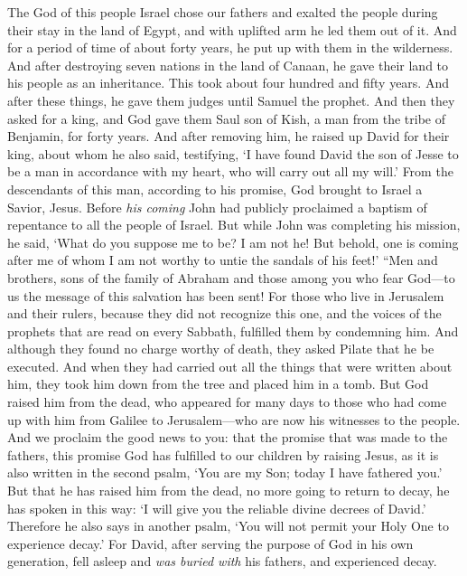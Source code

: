 \begin{biblechapter}
\verse The God of this people Israel chose our fathers and exalted the people during their stay in the land of Egypt, and with uplifted arm he led them out of it.
\verse And for a period of time of about forty years, he put up with them in the wilderness.
\verse And after destroying seven nations in the land of Canaan, he gave their land to his people as an inheritance.
\verse This took about four hundred and fifty years. And after these things, he gave them judges until Samuel the prophet.
\verse And then they asked for a king, and God gave them Saul son of Kish, a man from the tribe of Benjamin, for forty years.
\verse And after removing him, he raised up David for their king, about whom he also said, testifying, ‘I have found David the son of Jesse to be a man in accordance with my heart, who will carry out all my will.’
\verse From the descendants of this man, according to his promise, God brought to Israel a Savior, Jesus.
\verse Before \textit{his coming} John had publicly proclaimed a baptism of repentance to all the people of Israel.
\verse But while John was completing his mission, he said, ‘What do you suppose me to be? I am not he! But behold, one is coming after me of whom I am not worthy to untie the sandals of his feet!’
\verse “Men and brothers, sons of the family of Abraham and those among you who fear God—to us the message of this salvation has been sent!
\verse For those who live in Jerusalem and their rulers, because they did not recognize this one, and the voices of the prophets that are read on every Sabbath, fulfilled them by condemning him.
\verse And although they found no charge worthy of death, they asked Pilate that he be executed.
\verse And when they had carried out all the things that were written about him, they took him down from the tree and placed him in a tomb.
\verse But God raised him from the dead,
\verse who appeared for many days to those who had come up with him from Galilee to Jerusalem—who are now his witnesses to the people.
\verse And we proclaim the good news to you: that the promise that was made to the fathers,
\verse this promise God has fulfilled to our children by raising Jesus, as it is also written in the second psalm, ‘You are my Son; 
today I have fathered you.’
\verse But that he has raised him from the dead, no more going to return to decay, he has spoken in this way: ‘I will give you the reliable divine decrees of David.’
\verse Therefore he also says in another psalm, ‘You will not permit your Holy One to experience decay.’
\verse For David, after serving the purpose of God in his own generation, fell asleep and \textit{was buried with} his fathers, and experienced decay.

\end{biblechapter}
